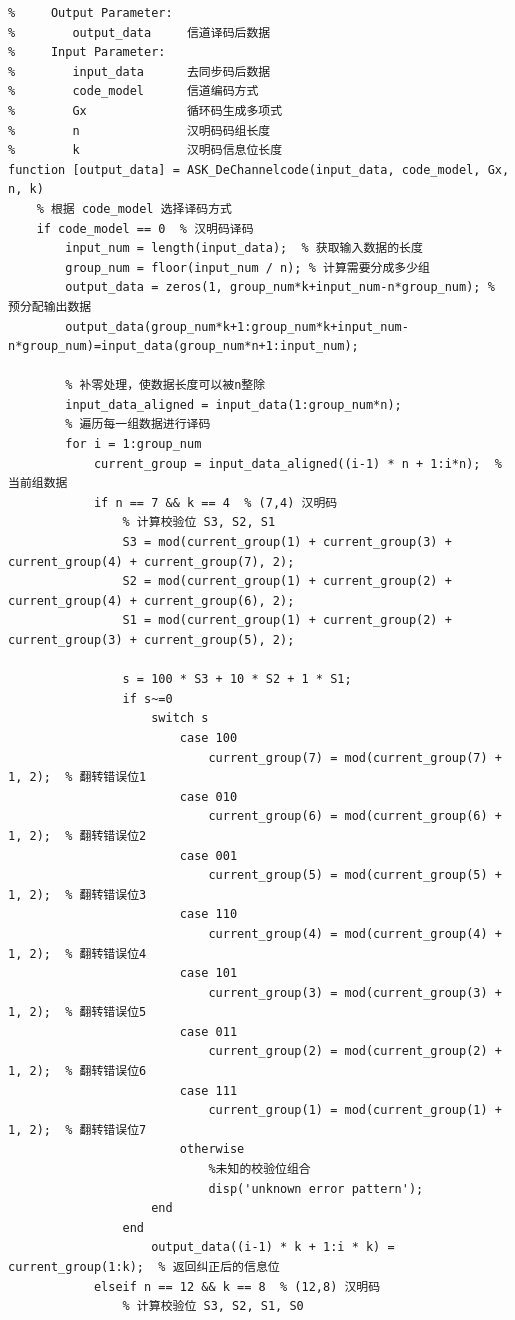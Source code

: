 \documentclass[UTF8]{ctexart}
\begin{document}
\begin{lstlisting}[title=ASK\_DeChannelcode.m(汉明码部分), frame=shadowbox]
%  Parameter List:
%     Output Parameter:
%        output_data     信道译码后数据
%     Input Parameter:
%        input_data      去同步码后数据
%        code_model      信道编码方式
%        Gx              循环码生成多项式
%        n               汉明码码组长度
%        k               汉明码信息位长度
function [output_data] = ASK_DeChannelcode(input_data, code_model, Gx, n, k)
    % 根据 code_model 选择译码方式
    if code_model == 0  % 汉明码译码
        input_num = length(input_data);  % 获取输入数据的长度
        group_num = floor(input_num / n); % 计算需要分成多少组
        output_data = zeros(1, group_num*k+input_num-n*group_num); % 预分配输出数据
        output_data(group_num*k+1:group_num*k+input_num-n*group_num)=input_data(group_num*n+1:input_num);
    
        % 补零处理，使数据长度可以被n整除
        input_data_aligned = input_data(1:group_num*n);
        % 遍历每一组数据进行译码
        for i = 1:group_num
            current_group = input_data_aligned((i-1) * n + 1:i*n);  % 当前组数据
            if n == 7 && k == 4  % (7,4) 汉明码
                % 计算校验位 S3, S2, S1
                S3 = mod(current_group(1) + current_group(3) + current_group(4) + current_group(7), 2);
                S2 = mod(current_group(1) + current_group(2) + current_group(4) + current_group(6), 2);
                S1 = mod(current_group(1) + current_group(2) + current_group(3) + current_group(5), 2);

                s = 100 * S3 + 10 * S2 + 1 * S1;
                if s~=0
                    switch s
                        case 100
                            current_group(7) = mod(current_group(7) + 1, 2);  % 翻转错误位1
                        case 010
                            current_group(6) = mod(current_group(6) + 1, 2);  % 翻转错误位2
                        case 001
                            current_group(5) = mod(current_group(5) + 1, 2);  % 翻转错误位3
                        case 110
                            current_group(4) = mod(current_group(4) + 1, 2);  % 翻转错误位4
                        case 101
                            current_group(3) = mod(current_group(3) + 1, 2);  % 翻转错误位5
                        case 011
                            current_group(2) = mod(current_group(2) + 1, 2);  % 翻转错误位6
                        case 111
                            current_group(1) = mod(current_group(1) + 1, 2);  % 翻转错误位7
                        otherwise
                            %未知的校验位组合
                            disp('unknown error pattern');
                    end
                end
                    output_data((i-1) * k + 1:i * k) = current_group(1:k);  % 返回纠正后的信息位          
            elseif n == 12 && k == 8  % (12,8) 汉明码
                % 计算校验位 S3, S2, S1, S0
                

\end{lstlisting}
\end{document}
